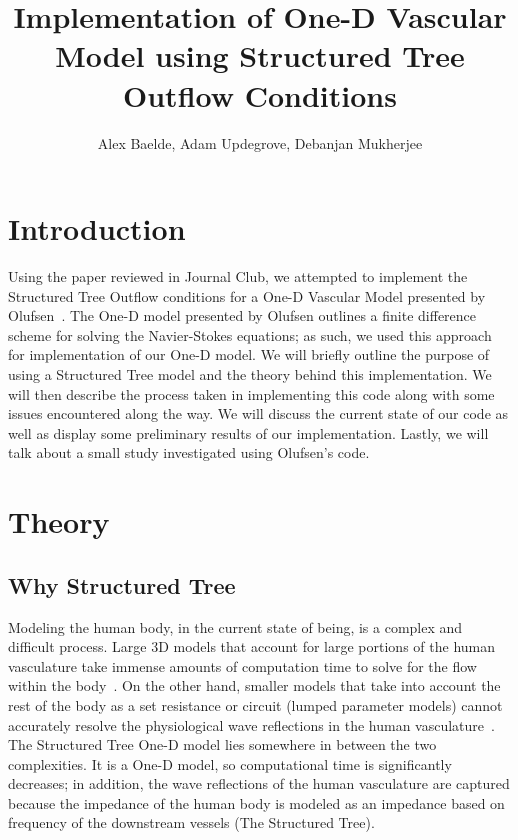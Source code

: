\documentclass[12pt]{article}
\title{Implementation of One-D Vascular Model using Structured Tree Outflow Conditions}
\author{Alex Baelde, Adam Updegrove, Debanjan Mukherjee}
\begin{document}
\maketitle
\section{Introduction}
Using the paper reviewed in Journal Club, we attempted to implement the Structured Tree Outflow conditions for a One-D Vascular Model presented by Olufsen~\cite{olufsen}. The One-D model presented by Olufsen outlines a finite difference scheme for solving the Navier-Stokes equations; as such, we used this approach for implementation of our One-D model. We will briefly outline the purpose of using a Structured Tree model and the theory behind this implementation.%
We will then describe the process taken in implementing this code along with some issues encountered along the way. We will discuss the current state of our code as well as display some preliminary results of our implementation. Lastly, we will talk about a small study investigated using Olufsen's code. 

\section{Theory}

\subsection{Why Structured Tree}

Modeling the human body, in the current state of being, is a complex and difficult process. Large 3D models that account for large portions of the human vasculature take immense amounts of computation time to solve for the flow within the body~\cite{someone}. On the other hand, smaller models that take into account the rest of the body as a set resistance or circuit (lumped parameter models) cannot accurately resolve the physiological wave reflections in the human vasculature~\cite{someone}. The Structured Tree One-D model lies somewhere in between the two complexities. It is a One-D model, so computational time is significantly decreases; in addition, the wave reflections of the human vasculature are captured because the impedance of the human body is modeled as an impedance based on frequency of the downstream vessels (The Structured Tree). %
\end{document}

